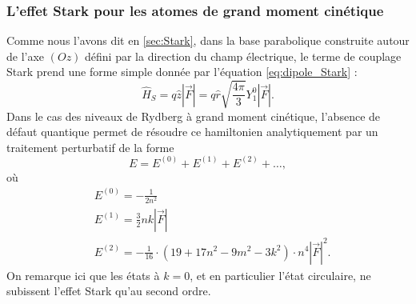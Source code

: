 \subsubsection*{L'effet Stark pour les atomes de grand moment cinétique}
\noindent Comme nous l'avons dit en \ref{sec:Stark}, dans la base parabolique construite autour de l'axe $(Oz)$ défini par la direction du champ électrique, le terme de couplage Stark prend une forme simple donnée par l'équation \eqref{eq:dipole_Stark} :
\begin{equation}
\label{eq:dipole_Stark2}
\hat{H}_S = q\hat{z}|\vec{F}| = q\hat{r} \sqrt{\frac{4\pi}{3}} Y_1^0  |\vec{F}|.
\end{equation}
%
Dans le cas des niveaux de Rydberg à grand moment cinétique, l'absence de défaut quantique permet de résoudre ce hamiltonien analytiquement par un traitement perturbatif de la forme \cite{TXT_BETHE_ONELECTRONATOMS} 
\begin{equation}
\label{eq:perturbative_energy}
E = E^{(0)}+E^{(1)}+E^{(2)}+\dots,
\end{equation}
où
\begin{equation}
\label{eq:Stark_circular}
\begin{aligned}
&E^{(0)} = -\frac{1}{2n^2} \\
&E^{(1)} = \frac{3}{2}nk|\vec{F}| \\
&E^{(2)} = -\frac{1}{16}\cdot (19+17n^2-9m^2-3k^2) \cdot n^4|\vec{F}|^2.
\end{aligned}
\end{equation}
%
On remarque ici que les états à $k=0$, et en particulier l'état circulaire, ne subissent l'effet Stark qu'au second ordre.

